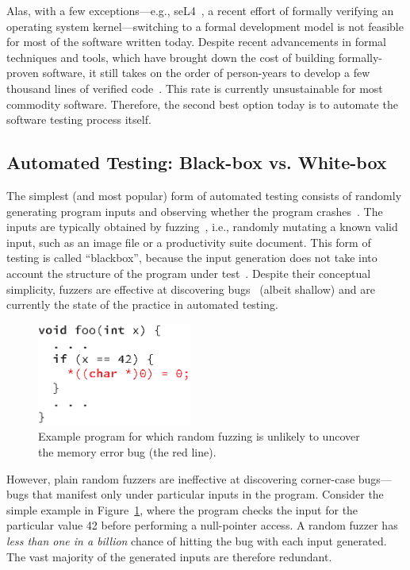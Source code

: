 Alas, with a few exceptions---e.g., seL4~\cite{seL4}, a recent effort of formally verifying an operating system kernel---switching to a formal development model is not feasible for most of the software written today.
%
Despite recent advancements in formal techniques and tools, which have brought down the cost of building formally-proven software, it still takes on the order of person-years to develop a few thousand lines of verified code~\cite{seL4}.
%
This rate is currently unsustainable for most commodity software.
%
Therefore, the second best option today is to automate the software testing process itself.


\subsection{Automated Testing: Black-box vs. White-box}

The simplest (and most popular) form of automated testing consists of randomly generating program inputs and observing whether the program crashes~\cite{fuzz,quickcheck,afl,autodafe,skipfish}.
%
The inputs are typically obtained by fuzzing~\cite{fuzz}, i.e., randomly mutating a known valid input, such as an image file or a productivity suite document.  This form of testing is called ``blackbox'', because the input generation does not take into account the structure of the program under test~\cite{blackbox-testing}.
%
Despite their conceptual simplicity, fuzzers are effective at discovering  bugs~\cite{afl,autodafe,skipfish} (albeit shallow) and are currently the state of the practice in automated testing.

\begin{figure}
  \centering
  \includegraphics[width=2.0in]{figures/intro/fuzzing-example}
  \caption{Example program for which random fuzzing is unlikely to uncover the memory error bug (the red line).}
  \label{fig:intro:fuzzing}
\end{figure}

However, plain random fuzzers are ineffective at discovering corner-case bugs---bugs that manifest only under particular inputs in the program.
%
Consider the simple example in Figure~\ref{fig:intro:fuzzing}, where the program checks the input for the particular value 42 before performing a null-pointer access.  A random fuzzer has \emph{less than one in a billion} chance of hitting the bug with each input generated.
%
The vast majority of the generated inputs are therefore redundant.

